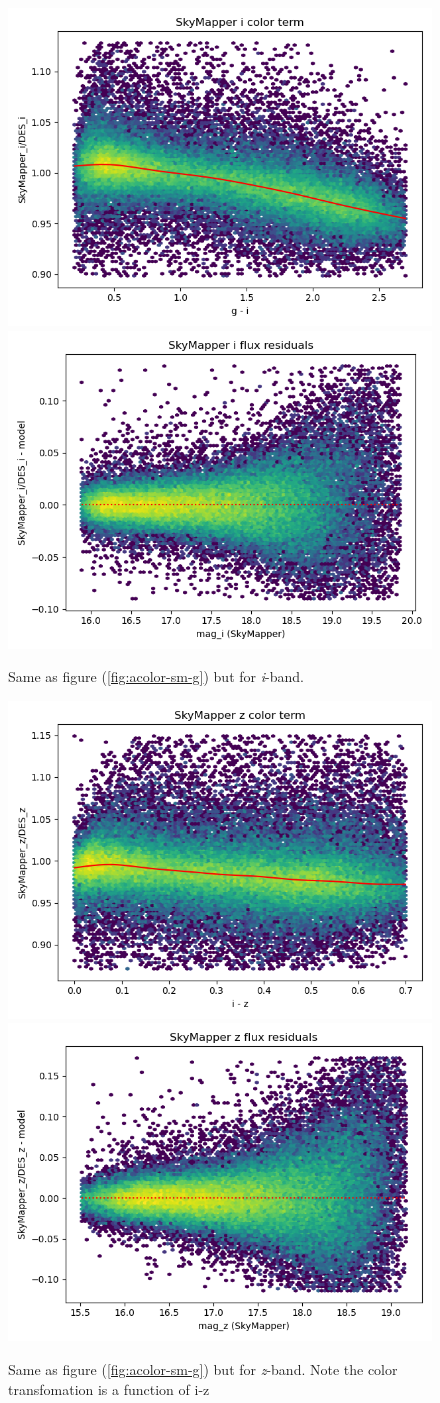 \begin{figure}
    \includegraphics[width=0.49\linewidth]{./figures/color_terms/SkyMapper_to_DES_band_i_color_term.png}
    \includegraphics[width=0.49\linewidth]{./figures/color_terms/SkyMapper_to_DES_band_i_flux_residuals.png}
    \caption{Same as figure (\ref{fig:acolor-sm-g}) but for \textit{i}-band.}
\end{figure}
\begin{figure}
    \includegraphics[width=0.49\linewidth]{./figures/color_terms/SkyMapper_to_DES_band_z_color_term.png}
    \includegraphics[width=0.49\linewidth]{./figures/color_terms/SkyMapper_to_DES_band_z_flux_residuals.png}
    \caption{Same as figure (\ref{fig:acolor-sm-g}) but for \textit{z}-band. Note the color transfomation is a function of i-z}
\end{figure}

